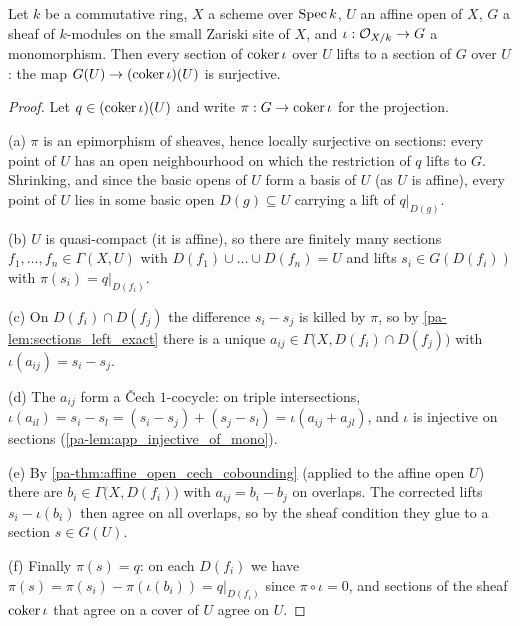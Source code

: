 \begin{theorem}
  \label{pa-thm:cokernel_app_surjective_affine_open}
  \leanok

  Let \(k\) be a commutative ring, \(X\) a scheme over \(\operatorname{Spec} k\), \(U\) an affine open of
  \(X\), \(G\) a sheaf of \(k\)-modules on the small Zariski site of \(X\), and
  \(\iota : \mathcal{O}_{X/k} \to G\) a monomorphism. Then every section of
  \(\operatorname{coker} \iota\) over \(U\) lifts to a section of \(G\) over \(U\): the map
  \(G(U) \to (\operatorname{coker} \iota)(U)\) is surjective.
\end{theorem}
\begin{proof}
  \leanok
  Let \(q \in (\operatorname{coker} \iota)(U)\) and write \(\pi : G \to \operatorname{coker} \iota\) for the projection.

  (a) \(\pi\) is an epimorphism of sheaves, hence locally surjective on sections: every point
  of \(U\) has an open neighbourhood on which the restriction of \(q\) lifts to \(G\).
  Shrinking, and since the basic opens of \(U\) form a basis of \(U\) (as \(U\) is affine),
  every point of \(U\) lies in some basic open \(D(g) \subseteq U\) carrying a lift of
  \(q|_{D(g)}\).

  (b) \(U\) is quasi-compact (it is affine), so there are finitely many sections
  \(f_1, \dots, f_n \in \Gamma(X, U)\) with \(D(f_1) \cup \dots \cup D(f_n) = U\) and lifts
  \(s_i \in G(D(f_i))\) with \(\pi(s_i) = q|_{D(f_i)}\).

  (c) On \(D(f_i) \cap D(f_j)\) the difference \(s_i - s_j\) is killed by \(\pi\), so by
  \ref{pa-lem:sections_left_exact} there is a unique
  \(a_{ij} \in \Gamma\bigl(X, D(f_i) \cap D(f_j)\bigr)\) with
  \(\iota(a_{ij}) = s_i - s_j\).

  (d) The \(a_{ij}\) form a \v{C}ech \(1\)-cocycle: on triple intersections,
  \(\iota(a_{il}) = s_i - s_l = (s_i - s_j) + (s_j - s_l) = \iota(a_{ij} + a_{jl})\), and
  \(\iota\) is injective on sections (\ref{pa-lem:app_injective_of_mono}).

  (e) By \ref{pa-thm:affine_open_cech_cobounding} (applied to the affine open \(U\)) there are
  \(b_i \in \Gamma\bigl(X, D(f_i)\bigr)\) with \(a_{ij} = b_i - b_j\) on overlaps. The
  corrected lifts \(s_i - \iota(b_i)\) then agree on all overlaps, so by the sheaf condition
  they glue to a section \(s \in G(U)\).

  (f) Finally \(\pi(s) = q\): on each \(D(f_i)\) we have
  \(\pi(s) = \pi(s_i) - \pi(\iota(b_i)) = q|_{D(f_i)}\) since \(\pi \circ \iota = 0\), and
  sections of the sheaf \(\operatorname{coker} \iota\) that agree on a cover of \(U\) agree on \(U\).
\end{proof}

